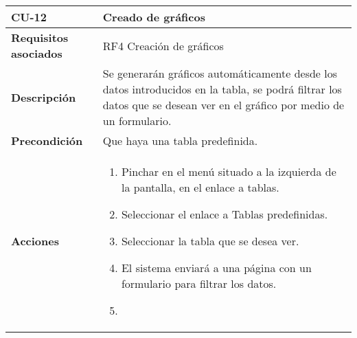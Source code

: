 \newpage
\begin{longtable}[H]{@{}ll@{}}
\toprule
\begin{minipage}[b]{0.23\columnwidth}\raggedright\strut
\textbf{CU-12}\strut
\end{minipage} & \begin{minipage}[b]{0.71\columnwidth}\raggedright\strut
\textbf{Creado de gráficos}\strut
\end{minipage}\tabularnewline
\midrule
\endhead
\begin{minipage}[t]{0.23\columnwidth}\raggedright\strut
\textbf{Requisitos asociados}\strut
\end{minipage} & \begin{minipage}[t]{0.71\columnwidth}\raggedright\strut
RF4 Creación de gráficos\strut
\end{minipage}\tabularnewline
\begin{minipage}[t]{0.23\columnwidth}\raggedright\strut
\textbf{Descripción}\strut
\end{minipage} & \begin{minipage}[t]{0.71\columnwidth}\raggedright\strut
Se generarán gráficos automáticamente desde los datos introducidos en la
tabla, se podrá filtrar los datos que se desean ver en el gráfico por medio de un
formulario.
\strut
\end{minipage}\tabularnewline
\begin{minipage}[t]{0.23\columnwidth}\raggedright\strut
\textbf{Precondición}\strut
\end{minipage} & \begin{minipage}[t]{0.71\columnwidth}\raggedright\strut
Que haya una tabla predefinida.\strut
\end{minipage}\tabularnewline
\begin{minipage}[t]{0.23\columnwidth}\raggedright\strut
\textbf{Acciones}\strut
\end{minipage} & \begin{minipage}[t]{0.71\columnwidth}\raggedright\strut
\begin{enumerate}
\def\labelenumi{\arabic{enumi}.}
\tightlist
\item
Pinchar en el menú situado a la izquierda de la pantalla, en el
enlace a tablas.
\item
Seleccionar el enlace a Tablas predefinidas.
\item
Seleccionar la tabla que se desea ver.
\item
El sistema enviará a una página con un formulario para filtrar los
datos. 
\item

\end{enumerate}
\end{minipage}
\end{longtable}
